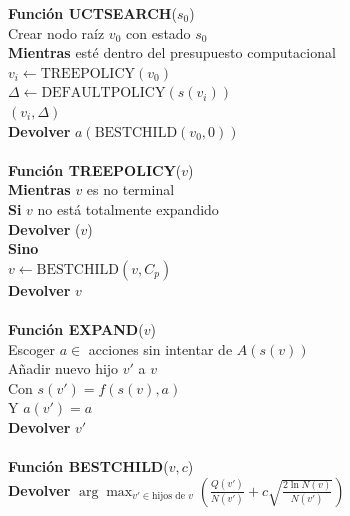 \documentclass[conference,a4paper]{IEEEtran}
\begin{document}
\begin{figure}[H]
  \begin{pseudo}
    \textbf{Función UCTSEARCH}($s_0$) \\
    \> Crear nodo raíz $v_0$ con estado $s_0$ \\
    \> \textbf{Mientras} esté dentro del presupuesto computacional \\
    \> \> $v_i \leftarrow \text{TREEPOLICY}(v_0)$ \\
    \> \> $\Delta \leftarrow \text{DEFAULTPOLICY}(s(v_i))$ \\
    \> \> $(v_i, \Delta)$ \\
    \> \textbf{Devolver} $a(\text{BESTCHILD}(v_0, 0))$ \\

    \\

    \textbf{Función TREEPOLICY}($v$) \\
    \> \textbf{Mientras} $v$ es no terminal \\
    \> \> \textbf{Si} $v$ no está totalmente expandido \\
    \> \> \> \textbf{Devolver} ($v$) \\
    \> \> \textbf{Sino} \\
    \> \> \> $v \leftarrow \text{BESTCHILD}(v, C_p)$ \\
    \> \textbf{Devolver} $v$ \\

    \\

    \textbf{Función EXPAND}($v$) \\
    \> Escoger $a \in$ acciones sin intentar de $A(s(v))$ \\
    \> Añadir nuevo hijo $v'$ a $v$ \\
    \> \> Con $s(v') = f(s(v), a)$ \\
    \> \> Y $a(v') = a$ \\
    \> \textbf{Devolver} $v'$ \\

    \\

    \textbf{Función BESTCHILD}($v, c$) \\
    \> \textbf{Devolver} $\displaystyle \arg\max_{v' \in \text{hijos de } v} \left( \frac{Q(v')}{N(v')} + c \sqrt{\frac{2 \ln N(v)}{N(v')}} \right)$ \\

    \\


\end{pseudo}
\end{figure}
\end{document}
